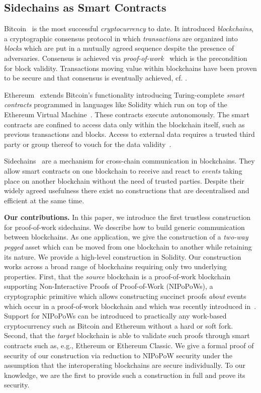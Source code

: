 \subsection{Sidechains as Smart Contracts}


Bitcoin~\cite{bitcoin} is the most successful \emph{cryptocurrency} to
date. It introduced \emph{blockchains}, a
cryptographic consensus protocol in which \emph{transactions} are organized
into \emph{blocks} which are put in a mutually agreed sequence despite the
presence of adversaries. Consensus is achieved via
\emph{proof-of-work}~\cite{pow} which is the precondition for block
validity.  Transactions moving value within blockchains have been proven to
be secure and that consensus is eventually achieved, cf.
\cite{backbone,pass-asynchronous,varbackbone}.

Ethereum~\cite{buterin} extends Bitcoin's functionality introducing
Turing-complete \emph{smart contracts} programmed in
languages like Solidity which run on top of the Ethereum Virtual
Machine~\cite{wood}. These contracts execute autonomously. The smart contracts
are confined to access data only within the blockchain itself, such as previous
transactions and blocks. Access to external data requires a trusted
third party or group thereof to vouch for the data validity~\cite{towncrier}.

Sidechains~\cite{sidechains} are a mechanism for cross-chain communication in
blockchains. They allow smart contracts on one blockchain to receive and
react to \textit{events} taking place on another blockchain without the need
of trusted parties. Despite their widely agreed usefulness
there exist no constructions that are decentralised and efficient at the same
time.


\noindent\textbf{Our contributions. } In this paper, we introduce the first
trustless construction for proof-of-work sidechains. We describe how to build
generic communication between blockchains. As one application, we give the
construction of a \emph{two-way pegged} asset which can be moved from one
blockchain to another while retaining its nature. We provide a high-level
construction in Solidity. Our construction works across a broad range of
blockchains requiring only two underlying properties. First, that the
\emph{source} blockchain is a proof-of-work blockchain supporting
Non-Interactive Proofs of Proof-of-Work (NIPoPoWs), a cryptographic primitive
which allows constructing succinct proofs \emph{about} events which occur in a
proof-of-work blockchain and which was recently introduced in~\cite{nipopows}.
Support for NIPoPoWs can be introduced to practically any
work-based cryptocurrency such as Bitcoin and Ethereum without a hard or soft
fork. Second, that the \emph{target} blockchain is able to validate such proofs
through smart contracts such as, e.g., Ethereum or Ethereum
Classic.
We give a formal proof of security of our construction via
reduction to NIPoPoW security under the assumption that the interoperating
blockchains are secure individually.
To our knowledge, we are the first to
provide such a construction in
full and prove its security.

